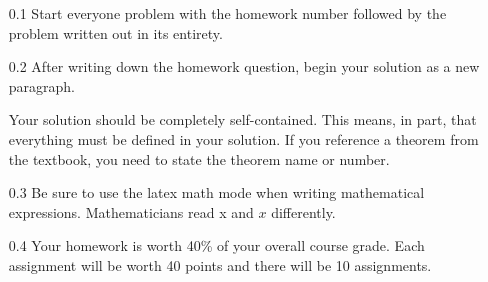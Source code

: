 \documentclass[12pt]{article}
\begin{document}
\pagestyle{fancy}  \chead{\textcolor{red}{02/15/2019}}
\rhead{\textcolor{red}{Austin Klum}} 
\lfoot{} \cfoot{} \rfoot{}

\begin{enumerate}
    \item[0.1] Start everyone problem with the homework number followed by the problem written out in its entirety. 
    \item[0.2] After writing down the homework question, begin your solution as a new paragraph. 
    
    \noindent Your solution should be completely self-contained. This means, in part, that everything must be defined in your solution. If you reference a theorem from the textbook, you need to state the theorem name or number.
    
    \item[0.3] Be sure to use the latex math mode when writing mathematical expressions. Mathematicians read x and $x$ differently. 
    
    \item[0.4] Your homework is worth 40\% of your overall course grade. Each assignment will be worth 40 points and there will be 10 assignments. 
    

\end{enumerate}
\end{document}
